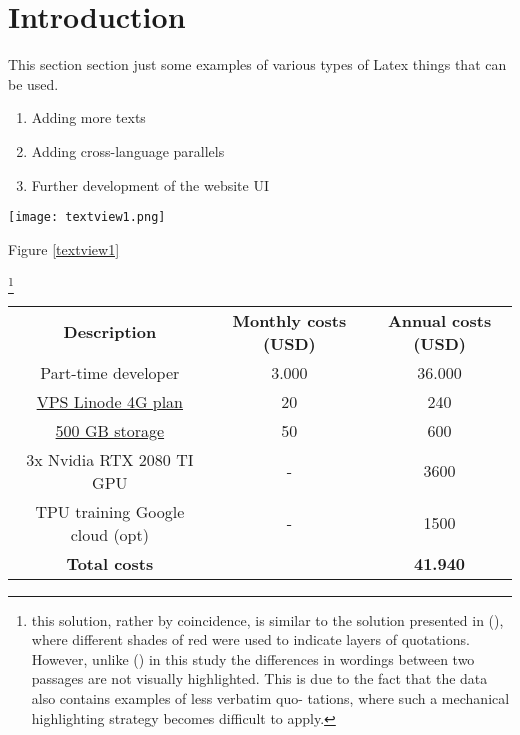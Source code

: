 \section{Introduction}

This section section just some examples of various types of Latex things that can be used.

\begin{enumerate}
 \item Adding more texts
 \item Adding cross-language parallels
 \item Further development of the website UI
\end{enumerate}

\newpage


\texttt{[image: textview1.png]}
\label{textview1}

\medskip
Figure \ref{textview1}

\footnote{this solution, rather by coincidence, is similar to the solution presented in (\cite{sturgeon2017}), where different shades of red were used to indicate layers of quotations. However, unlike (\cite{sturgeon2017}) in this study the differences in wordings between two passages are not visually highlighted. This is due to the fact that the data also contains examples of less verbatim quo-
tations, where such a mechanical highlighting strategy becomes difficult to apply.}



\begin{tabular}{ c c c }
 \textbf{Description} & \textbf{Monthly costs (USD)} & \textbf{Annual costs (USD)} \\ 
 Part-time developer & 3.000 & 36.000 \\  
 \href{https://www.linode.com/pricing}{VPS Linode 4G plan} & 20 & 240 \\
  \href{https://www.linode.com/blockstorage}{500 GB storage} & 50 & 600 \\
  3x Nvidia RTX 2080 TI GPU & - & 3600 \\
  TPU training Google cloud (opt) & - & 1500 \\
 \textbf{Total costs} & & \textbf{41.940}
\end{tabular}



